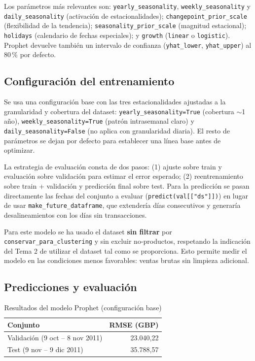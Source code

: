 \documentclass[11pt,a4paper]{article}
\begin{document}
Los parámetros más relevantes son: \texttt{yearly\_seasonality}, \texttt{weekly\_seasonality} y \texttt{daily\_seasonality} (activación de estacionalidades); \texttt{changepoint\_prior\_scale} (flexibilidad de la tendencia); \texttt{seasonality\_prior\_scale} (magnitud estacional); \texttt{holidays} (calendario de fechas especiales); y \texttt{growth} (\texttt{linear} o \texttt{logistic}). Prophet devuelve también un intervalo de confianza (\texttt{yhat\_lower}, \texttt{yhat\_upper}) al 80\,\% por defecto.

\subsection{Configuración del entrenamiento}

Se usa una configuración base con las tres estacionalidades ajustadas a la granularidad y cobertura del dataset: \texttt{yearly\_seasonality=True} (cobertura $\sim$1 año), \texttt{weekly\_seasonality=True} (patrón intrasemanal claro) y \texttt{daily\_seasonality=False} (no aplica con granularidad diaria). El resto de parámetros se dejan por defecto para establecer una línea base antes de optimizar.

La estrategia de evaluación consta de dos pasos: (1) ajuste sobre train y evaluación sobre validación para estimar el error esperado; (2) reentrenamiento sobre train + validación y predicción final sobre test. Para la predicción se pasan directamente las fechas del conjunto a evaluar (\texttt{predict(val[["ds"]])}) en lugar de usar \texttt{make\_future\_dataframe}, que extendería días consecutivos y generaría desalineamientos con los días sin transacciones.

Para este modelo se ha usado el dataset \textbf{sin filtrar} por \texttt{conservar\_para\_clustering} y sin excluir no-productos, respetando la indicación del Tema 2 de utilizar el dataset tal como se proporciona. Esto permite medir el modelo en las condiciones menos favorables: ventas brutas sin limpieza adicional.

\subsection{Predicciones y evaluación}

\begin{table}[h]
\centering
\caption{Resultados del modelo Prophet (configuración base)}
\begin{tabular}{lr}
\toprule
\textbf{Conjunto} & \textbf{RMSE (GBP)} \\
\midrule
Validación (9 oct -- 8 nov 2011) & 23.040,22 \\
Test (9 nov -- 9 dic 2011) & 35.788,57 \\
\bottomrule
\end{tabular}
\end{table}
\end{document}
